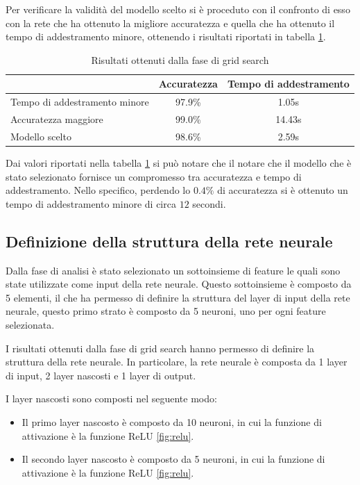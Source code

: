 Per verificare la validità del modello scelto si è proceduto con il confronto di
esso con la rete che ha ottenuto la migliore accuratezza e quella che ha ottenuto
il tempo di addestramento minore, ottenendo i risultati riportati in tabella \ref{tab:ris-grid-search}.
\begin{table}[ht]
    \centering
    \begin{tabular}{@{}lcc@{}}
        \toprule
        \rowcolor[HTML]{EFEFEF}
        \multicolumn{1}{c}{\cellcolor[HTML]{EFEFEF}\textbf{Modello}} & \textbf{Accuratezza} & \textbf{Tempo di addestramento} \\ \midrule
        Tempo di addestramento minore                                & 97.9\%               & 1.05s                           \\
        Accuratezza maggiore                                         & 99.0\%               & 14.43s                          \\
        Modello scelto                                               & 98.6\%               & 2.59s                           \\ \bottomrule
    \end{tabular}
    \caption{Risultati ottenuti dalla fase di grid search}
    \label{tab:ris-grid-search}
\end{table}

Dai valori riportati nella tabella \ref{tab:ris-grid-search} si può notare che il
notare che il modello che è stato selezionato fornisce un compromesso tra
accuratezza e tempo di addestramento. Nello specifico, perdendo lo $0.4\%$ di
accuratezza si è ottenuto un tempo di addestramento minore di circa $12$ secondi.
\subsection{Definizione della struttura della rete neurale}
Dalla fase di analisi è stato selezionato un sottoinsieme di feature le quali
sono state utilizzate come input della rete neurale. Questo sottoinsieme è
composto da 5 elementi, il che ha permesso di definire la struttura del layer di
input della rete neurale, questo primo strato è composto da 5 neuroni, uno per 
ogni feature selezionata.

I risultati ottenuti dalla fase di grid search hanno permesso di definire la
struttura della rete neurale. In particolare, la rete neurale è composta da 1
layer di input, 2 layer nascosti e 1 layer di output.

I layer nascosti sono composti nel seguente modo:
\begin{itemize}
    \item Il primo layer nascosto è composto da 10 neuroni, in cui la funzione di
          attivazione è la funzione ReLU \ref{fig:relu}.
    \item Il secondo layer nascosto è composto da 5 neuroni, in cui la funzione
          di attivazione è la funzione ReLU \ref{fig:relu}.
\end{itemize}

